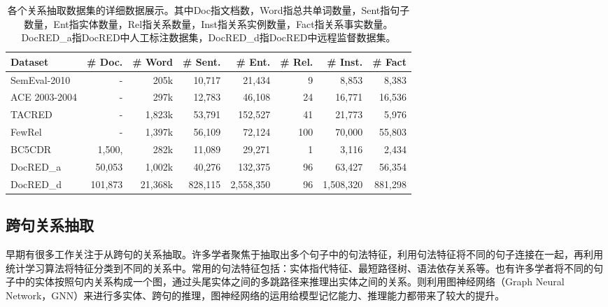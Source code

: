 \begin{table}[]
\centering
\begin{tabular}{lrrrrrrr}
\toprule
Dataset             & \# Doc. & \# Word & \# Sent. & \# Ent.   & \# Rel. & \# Inst.  & \# Fact \\
\midrule
SemEval-2010 & -       & 205k    & 10,717   & 21,434    & 9       & 8,853     & 8,383   \\
ACE 2003-2004       & -       & 297k    & 12,783   & 46,108    & 24      & 16,771    & 16,536  \\
TACRED              & -       & 1,823k  & 53,791   & 152,527   & 41      & 21,773    & 5,976   \\
FewRel              & -       & 1,397k  & 56,109   & 72,124    & 100     & 70,000    & 55,803  \\
\midrule
BC5CDR              & 1,500,  & 282k    & 11,089   & 29,271    & 1       & 3,116     & 2,434   \\
DocRED\_a   & 50,053  & 1,002k  & 40,276   & 132,375   & 96      & 63,427    & 56,354  \\
DocRED\_d      & 101,873 & 21,368k & 828,115  & 2,558,350 & 96      & 1,508,320 & 881,298 \\
\bottomrule
\end{tabular}
\caption{各个关系抽取数据集的详细数据展示。其中Doc指文档数，Word指总共单词数量，Sent指句子数量，Ent指实体数量，Rel指关系数量，Inst指关系实例数量，Fact指关系事实数量。DocRED\_a指DocRED中人工标注数据集，DocRED\_d指DocRED中远程监督数据集。}
\label{table:related_work:dataset_stat}
\end{table}


\subsection{跨句关系抽取}
早期有很多工作关注于从跨句的关系抽取。许多学者\cite{swampillai2011extracting,yoshikawa2011coreference,quirk2017distant}聚焦于抽取出多个句子中的句法特征，利用句法特征将不同的句子连接在一起，再利用统计学习算法将特征分类到不同的关系中。常用的句法特征包括：实体指代特征、最短路径树、语法依存关系等。也有许多学者\cite{zeng2017incorporating,christopoulou2018walk}将不同的句子中的实体按照句内关系构成一个图，通过头尾实体之间的多跳路径来推理出实体之间的关系。\citet{peng2017cross,song2018n}则利用图神经网络（Graph Neural Network，GNN）来进行多实体、跨句的推理，图神经网络的运用给模型记忆能力、推理能力都带来了较大的提升。


